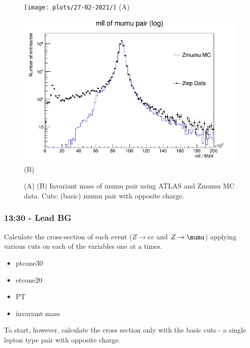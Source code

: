 \begin{figure}[h!]
    \centering
    \begin{minipage}{0.5\textwidth}
        \centering
        \texttt{[image: plots/27-02-2021/]}
        (A)
    \end{minipage}\hfill
    \begin{minipage}{0.5\textwidth}
        \centering
        \includegraphics[width=\linewidth]{plots/27-02-2021/2-Stack-Zmumu-fast_mll_log-y_0-200GeV_(basic_2lep=mumu_opp-c)_27-02-21_12-07.png}
        (B)
    \end{minipage}
    \caption{(A)  (B) Invariant mass of mumu pair using ATLAS and Zmumu MC data.  Cuts: (basic) mumu pair with opposite charge.}
    \label{fig:Stack-Zmumu-fast_mll_log-y_0-200GeV_(basic_2lep=mumu_opp-c)_27-02-21_12-07}
\end{figure}


\subsubsection*{13:30 - Lead BG}
Calculate the cross-section of each event ($Z \rightarrow ee$ and $Z \rightarrow \mumu$) applying various cuts on each of the variables one at a times.
\begin{itemize}
    \item ptcone30
    \item etcone20
    \item PT
    \item invariant mass
\end{itemize}
To start, however, calculate the cross section only with the basic cuts - a single lepton type pair with opposite charge.

